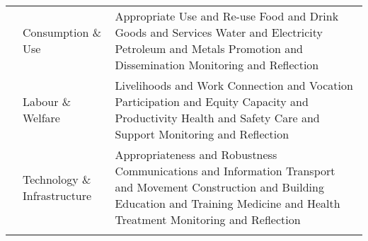 \begin{table}[th]
\begin{center}
\begin{tabular}{ >{\raggedright\arraybackslash}p{} >{\raggedright\arraybackslash}p{} >{\raggedright\arraybackslash}p{} }
  & Consumption \& Use & Appropriate Use and Re-use \linebreak Food and Drink \linebreak Goods and Services \linebreak Water and Electricity \linebreak Petroleum and Metals \linebreak Promotion and Dissemination \linebreak Monitoring and Reflection \linebreak \\
  & Labour \& Welfare & Livelihoods and Work \linebreak Connection and Vocation \linebreak Participation and Equity \linebreak Capacity and Productivity \linebreak Health and Safety \linebreak Care and Support \linebreak Monitoring and Reflection \linebreak \\
  & Technology \& Infrastructure & Appropriateness and Robustness \linebreak Communications and Information \linebreak Transport and Movement \linebreak Construction and Building \linebreak Education and Training \linebreak Medicine and Health Treatment \linebreak Monitoring and Reflection \\
\hline
\label{tbl:incomesByUfarmens0}
\end{tabular}
\end{center}
\end{table}

